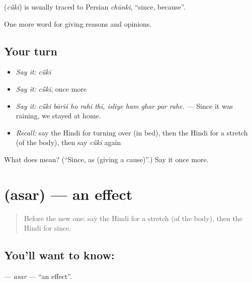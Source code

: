 \begin{cousinweb}
\textbf{} (\emph{cū̃ki}) is usually traced to Persian \emph{chūnki}, \textquotedblleft{}since, because\textquotedblright{}.
\end{cousinweb}

\begin{grammarlens}[title={What you've built}]
One more word for giving reasons and opinions.
\end{grammarlens}

\subsection*{Your turn}
\begin{itemize}
\raggedright
  \item \emph{Say it:} \emph{cū̃ki}
  \item \emph{Say it:} \emph{cū̃ki}, once more
  \item \emph{Say it:} \emph{cū̃ki bāriś ho rahī thī, isliye ham ghar par rahe.} — Since it was raining, we stayed at home.
  \item \emph{Recall:} say the Hindi for turning over (in bed), then the Hindi for a stretch (of the body), then say \emph{cū̃ki} again
\end{itemize}

\begin{tcolorbox}[breakable,colback=teal!4,colframe=teal!35!black,title={Before you move on}]
What does  mean? (\textquotedblleft{}Since, as (giving a cause)\textquotedblright{}.) Say it once more.
\end{tcolorbox}
\section[\texorpdfstring{\hi{असर} (asar)}{असर (asar)}]{ (asar) — an effect}

\label{lesson:HI-C343-asar}



\begin{quote}
Before the new one: say the Hindi for a stretch (of the body), then the Hindi for since.
\end{quote}

\subsection*{You'll want to know: }
\textbf{} — \emph{asar} — \textquotedblleft{}an effect\textquotedblright{}.

